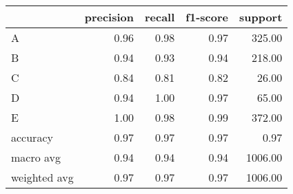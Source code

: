 \begin{tabular}{|l|r|r|r|r|}
\hline
{} &  precision &  recall &  f1-score &  support \\
\hline
A            &       0.96 &    0.98 &      0.97 &   325.00 \\
B            &       0.94 &    0.93 &      0.94 &   218.00 \\
C            &       0.84 &    0.81 &      0.82 &    26.00 \\
D            &       0.94 &    1.00 &      0.97 &    65.00 \\
E            &       1.00 &    0.98 &      0.99 &   372.00 \\
accuracy     &       0.97 &    0.97 &      0.97 &     0.97 \\
macro avg    &       0.94 &    0.94 &      0.94 &  1006.00 \\
weighted avg &       0.97 &    0.97 &      0.97 &  1006.00 \\
\hline
\end{tabular}
